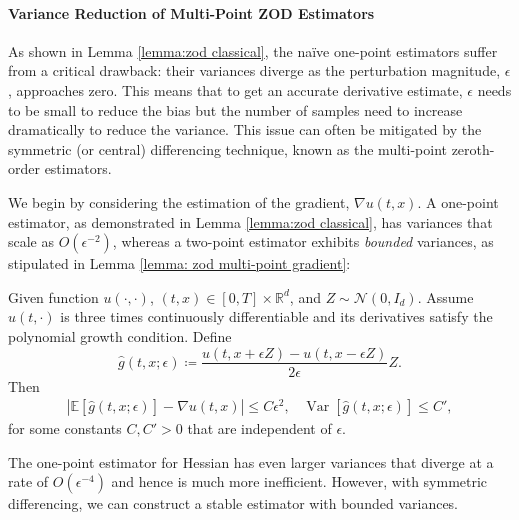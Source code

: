 \documentclass[twoside,11pt]{article}
\newcommand{\E}{\mathbb{E}}
\newcommand{\R}{\mathbb{R}}
\newcommand{\1}{\mathbf{1}}
\DeclareMathOperator{\Var}{Var}
\numberwithin{equation}{section}
\newcommand{\defeq}{\coloneqq}
\begin{document}
\paragraph{Variance Reduction of Multi-Point ZOD Estimators}
As shown in Lemma \ref{lemma:zod classical}, the na\"ive one-point estimators suffer from a critical drawback: their variances diverge as the perturbation magnitude, $\epsilon$, approaches zero. This means that to get an accurate derivative estimate, $\epsilon$ needs to be small to reduce the bias but the number of samples need to increase dramatically to reduce the variance. This issue can often be mitigated by the symmetric (or central) differencing technique, known as the multi-point zeroth-order estimators.


We begin by considering the estimation of the gradient, $\nabla u(t,x)$. A one-point estimator, as demonstrated in Lemma \ref{lemma:zod classical}, has variances that scale as $O(\epsilon^{-2})$, whereas a two-point estimator exhibits  {\it bounded} variances, as stipulated in Lemma \ref{lemma: zod multi-point gradient}:
\begin{lemma}
\label{lemma: zod multi-point gradient}
Given function $u(\cdot,\cdot)$, $ (t,x)\in [0,T]\times \R^d$, and $ Z \sim \mathcal{N}(0,I_d)$. Assume $u(t, \cdot)$ is three times continuously differentiable and its derivatives satisfy the polynomial growth condition. Define
\begin{equation}
\label{eq:symmetric_gradient_estimator}
\hat{g}(t, x; \epsilon) \defeq \frac{u(t, x+\epsilon Z) - u(t, x-\epsilon Z)}{2\epsilon} Z.
\end{equation}
Then
\begin{align}
\left| \E\left[ \hat{g}(t, x; \epsilon) \right] - \nabla u(t,x) \right| \le C \epsilon^2, \;\;\;
\Var\left[ \hat{g}(t, x; \epsilon) \right]  \le C',
\end{align}
for some constants $C, C'> 0$ that are independent of $\epsilon$.
\end{lemma}



The one-point estimator for Hessian has even larger variances that diverge at a rate of $O(\epsilon^{-4})$ and hence is much more inefficient. However, with symmetric differencing, we can construct a stable estimator with bounded variances.
\end{document}
